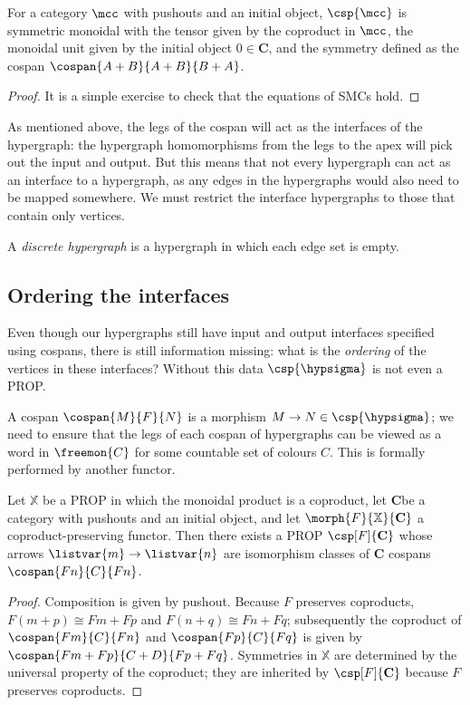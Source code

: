 \begin{lemma}
    For a category \(\mcc\) with pushouts and an initial object,
    \(\csp{\mcc}\) is symmetric monoidal with the tensor given by the
    coproduct in \(\mcc\), the monoidal unit given by the initial object
    \(0 \in \mathbf{C}\), and the symmetry defined as the cospan
    \(\cospan{A+B}{A+B}{B+A}\).
\end{lemma}
\begin{proof}
    It is a simple exercise to check that the equations of SMCs hold.
\end{proof}

As mentioned above, the legs of the cospan will act as the interfaces of the
hypergraph: the hypergraph homomorphisms from the legs to the apex will pick out
the input and output.
But this means that not every hypergraph can act as an interface to a
hypergraph, as any edges in the hypergraphs would also need to be mapped
somewhere.
We must restrict the interface hypergraphs to those that contain only vertices.

\begin{definition}
    A \emph{discrete hypergraph} is a hypergraph in which each edge set is
    empty.
\end{definition}

\subsection{Ordering the interfaces}

Even though our hypergraphs still have input and output interfaces specified
using cospans, there is still information missing: what is the \emph{ordering}
of the vertices in these interfaces?
Without this data \(\csp{\hypsigma}\) is not even a PROP.

A cospan \(\cospan{M}{F}{N}\) is a morphism
\(M \to N \in \csp{\hypsigma}\); we need to ensure that the legs of each
cospan of hypergraphs can be viewed as a word in \(\freemon{C}\) for some
countable set of colours \(C\).
This is formally performed by another functor.

\begin{theorem}\label{thm:csp-construction}
    Let \(\mathbb{X}\) be a PROP in which the monoidal product is a coproduct,
    let \(\mathbf{C}\)be  a category with pushouts and an initial object, and
    let \(\morph{F}{\mathbb{X}}{\mathbf{C}}\) a coproduct-preserving functor.
    Then there exists a PROP \(\csp[F]{\mathbf{C}}\) whose arrows
    \(\listvar{m} \to \listvar{n}\) are isomorphism classes of \(\mathbf{C}\)
    cospans \(\cospan{Fn}{C}{Fn}\).
\end{theorem}
\begin{proof}
    Composition is given by pushout.
    Because \(F\) preserves coproducts, \(F(m+p) \cong Fm + Fp\) and
    \(F(n+q) \cong Fn + Fq\); subsequently the coproduct of
    \(\cospan{Fm}{C}{Fn}\) and \(\cospan{Fp}{C}{Fq}\) is given by \(
    \cospan{Fm + Fp}{C + D}{Fp + Fq}
    \).
    Symmetries in \(\mathbb{X}\) are determined by the universal property of
    the coproduct; they are inherited by \(\csp[F]{\mathbf{C}}\) because \(F\)
    preserves coproducts.
\end{proof}

